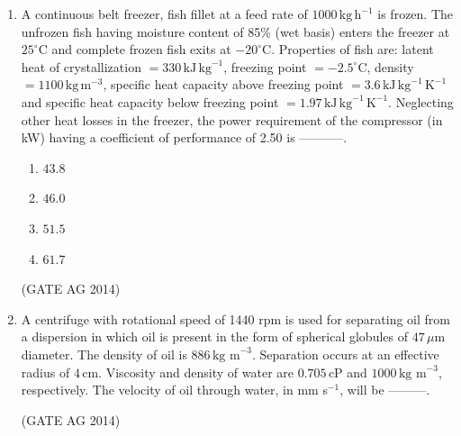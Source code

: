 \documentclass[journal,12pt,onecolumn]{IEEEtran}
\begin{document}
\begin{enumerate}
\hfill(GATE AG 2014)

\begin{multicols}{4}
\begin{enumerate}
\item $43.8$  
\item $46.0$  
\item $51.5$  
\item $61.7$  
\end{enumerate}
\end{multicols}
\hfill(GATE AG 2014)

\item A continuous belt freezer, fish fillet at a feed rate of 
$1000 \, \text{kg} \, \text{h}^{-1}$ is frozen. The unfrozen fish having moisture 
content of 85\% (wet basis) enters the freezer at $25^\circ \text{C}$ and complete 
frozen fish exits at $-20^\circ \text{C}$.  
Properties of fish are: latent heat of crystallization $= 330 \, \text{kJ} \, \text{kg}^{-1}$, 
freezing point $= -2.5^\circ \text{C}$, density $= 1100 \, \text{kg} \, \text{m}^{-3}$, 
specific heat capacity above freezing point $= 3.6 \, \text{kJ} \, \text{kg}^{-1} \, 
\text{K}^{-1}$ and specific heat capacity below freezing point $= 1.97 \, \text{kJ} \, 
\text{kg}^{-1} \, \text{K}^{-1}$.  
Neglecting other heat losses in the freezer, the power requirement of the 
compressor (in kW) having a coefficient of performance of 2.50 is -----------.

\begin{multicols}{4}
\begin{enumerate}
\item $43.8$  
\item $46.0$  
\item $51.5$  
\item $61.7$  
\end{enumerate}
\end{multicols}
\hfill(GATE AG 2014)



\item A centrifuge with rotational speed of 1440 rpm is used for separating oil from a dispersion 
in which oil is present in the form of spherical globules of $47 \, \mu$m diameter. 
The density of oil is $886 \, \text{kg m}^{-3}$.  
Separation occurs at an effective radius of $4 \, \text{cm}$.  
Viscosity and density of water are $0.705 \, \text{cP}$ and $1000 \, \text{kg m}^{-3}$, respectively.  
The velocity of oil through water, in mm s$^{-1}$, will be ---------.

\hfill(GATE AG 2014)


\end{enumerate}
\end{document}

